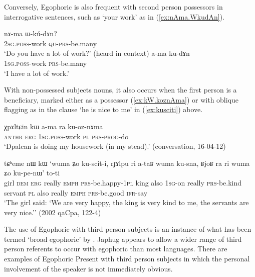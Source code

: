 Conversely, Egophoric is also frequent with second person possessors in interrogative sentences, such as  `your work' as in (\ref{ex:nAma.WkudAn}).

\begin{exe} 
	\ex 
	\begin{xlist}
		\ex \label{ex:nAma.WkudAn}
		\gll nɤ-ma ɯ-kú-dɤn? \\
		\textsc{2sg}.\textsc{poss}-work \textsc{qu}-\textsc{prs}-be.many \\
		\glt `Do you have a lot of work?' (heard in context)
		\ex \label{ex:ama.kudAn}
		\gll a-ma ku-dɤn \\
		\textsc{1sg}.\textsc{poss}-work \textsc{prs}-be.many \\
		\glt `I have a lot of work.' 
	\end{xlist}
\end{exe} 

With non-possessed subjects nouns, it also occurs when the first person is a beneficiary, marked either as a possessor (\ref{ex:kW.koznAma}) or with oblique flagging as in the clause  `he is nice to me' in (\ref{ex:kusciti}) above.

\begin{exe}
	\ex \label{ex:kW.koznAma}
	\gll χpɤltɕin kɯ a-ma ra ku-oz-nɤma \\
	\textsc{anthr} \textsc{erg} \textsc{1sg}.\textsc{poss}-work \textsc{pl} \textsc{prs}-\textsc{prog}-do \\
	\glt `Dpalcan is doing my housework (in my stead).' (conversation, 16-04-12)
\end{exe}

\begin{exe}
	\ex \label{ex:kusciti}
	\gll tɕʰeme nɯ kɯ `wuma ʑo ku-scit-i, rɟɤlpu ri a-taʁ wuma ku-sna, ʁjoʁ ra ri wuma ʑo ku-pe-nɯ' to-ti\\
	girl \textsc{dem} \textsc{erg} really \textsc{emph} \textsc{prs}-be.happy-\textsc{1pl}  king also \textsc{1sg}-on really \textsc{prs}-be.kind servant \textsc{pl} also really \textsc{emph}   \textsc{prs}-be.good \textsc{ifr}-say\\
	\glt `The girl said: `We are very happy, the king is very kind to me, the servants are very nice.'' (2002 qaCpa, 122-4)
\end{exe}

The use of Egophoric with third person subjects is an instance of what has been termed `broad egophoric' by \citep[89]{gawne17bodish}. Japhug appears to allow a wider range of third person referents to occur with egophoric than most languages. There are examples of Egophoric Present with third person subjects in which the personal involvement of the speaker is not immediately obvious.



